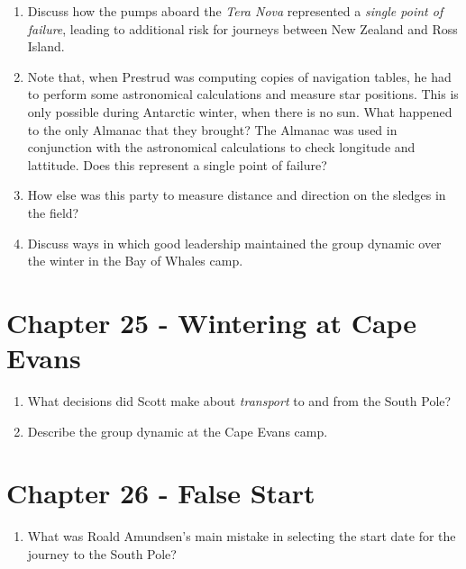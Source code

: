 \documentclass{article}
\begin{document}
\begin{enumerate}
\item Discuss how the pumps aboard the \textit{Tera Nova} represented a \textit{single point of failure}, leading to additional risk for journeys between New Zealand and Ross Island. \\ \vspace{2cm}
\item Note that, when Prestrud was computing copies of navigation tables, he had to perform some astronomical calculations and measure star positions.  This is only possible during Antarctic winter, when there is no sun.  What happened to the only Almanac that they brought?  The Almanac was used in conjunction with the astronomical calculations to check longitude and lattitude.  Does this represent a single point of failure? \\ \vspace{2cm}
\item How else was this party to measure distance and direction on the sledges in the field? \\ \vspace{2cm}
\item Discuss ways in which good leadership maintained the group dynamic over the winter in the Bay of Whales camp. \\ \vspace{2cm}
\end{enumerate}

\section{Chapter 25 - Wintering at Cape Evans}

\begin{enumerate}
\item What decisions did Scott make about \textit{transport} to and from the South Pole? \\ \vspace{2cm}
\item Describe the group dynamic at the Cape Evans camp. \\ \vspace{2cm}
\end{enumerate}

\section{Chapter 26 - False Start}

\begin{enumerate}
\item What was Roald Amundsen's main mistake in selecting the start date for the journey to the South Pole? \\ \vspace{1cm}
\end{enumerate}
\end{document}
